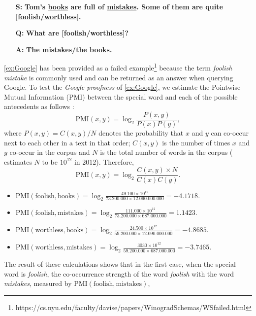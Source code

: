 \begin{itemize}
	\item[\textbf{S:}] \textbf{Tom's \underline{books} are full of \underline{mistakes}. Some of them are quite \underline{[foolish/worthless]}.}
	\item[\textbf{Q:}] \textbf{What are [foolish/worthless]?}
	\item[\textbf{A:}] \textbf{The mistakes/the books.}
\end{itemize}


\ref{ex:Google} has been provided as a failed example\footnote{https://cs.nyu.edu/faculty/davise/papers/WinogradSchemas/WSfailed.html} because the term \textit{foolish mistake} is commonly used and can be returned as an answer when querying Google.
To test the \textit{Google-proofness} of \ref{ex:Google}, we estimate the Pointwise Mutual Information (PMI) between the special word and each of the possible antecedents as follows \cite{google, Church}:
\begin{equation}
\text{PMI}\left(x,y\right) = \log_2\frac{P\left(x,y\right)}{P\left(x\right)P\left(y\right)},
\end{equation}
where $P\left(x,y\right)=C\left(x,y\right)/N$ denotes the probability that $x$ and $y$ can co-occur next to each other in a text in that order; $C\left(x,y\right)$ is the number of times $x$ and $y$ co-occur in the corpus and $N$ is the total number of words in the corpus (\cite{google} estimates $N$ to be $10^{12}$ in 2012). Therefore,
\begin{equation}
	\text{PMI}\left(x,y\right)=\log_2\frac{C\left(x,y\right)\times N}{C\left(x\right)C\left(y\right)}.
\end{equation}
\begin{itemize}
	\item $\text{PMI}\left(\text{foolish},\text{books}\right)=\log_2\frac{49.100\times10^{12}}{73.200.000\times12.090.000.000}=-4.1718$.
	\item $\text{PMI}\left(\text{foolish},\text{mistakes}\right)=\log_2\frac{111.000\times10^{12}}{73.200.000\times687.000.000 }=1.1423$.
	\item $\text{PMI}\left(\text{worthless},\text{books}\right)=\log_2\frac{24.500\times10^{12}}{59.200.000\times12.090.000.000}=-4.8685$.
	\item $\text{PMI}\left(\text{worthless},\text{mistakes}\right)=\log_2\frac{3030\times10^{12}}{59.200.000\times687.000.000}=-3.7465$.
\end{itemize}
The result of these calculations shows that in the first case, when the special word is \textit{foolish}, the co-occurrence strength of the word \textit{foolish} with the word \textit{mistakes}, measured by $\text{PMI}\left(\text{foolish},\text{mistakes}\right)$,
